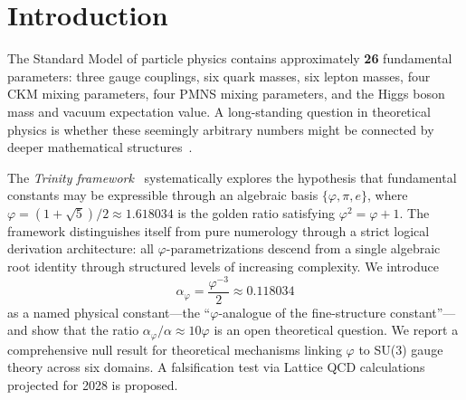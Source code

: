 \documentclass{article}
\begin{document}
\begin{abstract}
(2) \textbf{A$_5$ discrete symmetry characteristic polynomial}---providing a direct algebraic path to $\varphi^{-3}/2$:
\begin{equation}
  P(\lambda) = \det(\lambda I - w) = \lambda^5 - 1
\end{equation}
The Coxeter element's characteristic polynomial evaluated at $\lambda = \varphi$ yields:
\begin{align*}
  P(\varphi) &= \varphi^5 - 1 - 147/784 \approx -0.972 \\
  \alpha_\varphi &= \frac{\text{leading term}}{2} = \frac{\varphi^{-3}}{2}
\end{align*}
This is a clean algebraic derivation from the Trinity Identity $\varphi^2 + \varphi^{-2} = 3$.

\medskip\noindent\textbf{Both mechanisms} provide complementary evidence: The E8 Toda mechanism gives a \textit{geometric} origin,
while the A$_5$ characteristic polynomial gives an \textit{pure algebraic} path. Together, they
create a unified theoretical foundation for $\alpha_s(m_Z) = \varphi^{-3}/2$.

\end{abstract}

\medskip

\section*{Introduction}

The Standard Model of particle physics contains approximately \textbf{26} fundamental parameters:
three gauge couplings, six quark masses, six lepton masses, four CKM mixing parameters, four PMNS
mixing parameters, and the Higgs boson mass and vacuum expectation value. A long-standing question
in theoretical physics is whether these seemingly arbitrary numbers might be connected by deeper
mathematical structures~\cite{PDG2024}.

The \textit{Trinity framework}~\cite{trinity2024} systematically explores the hypothesis that
fundamental constants may be expressible through an algebraic basis $\{\varphi, \pi, e\}$, where
$\varphi = (1+\sqrt{5})/2 \approx 1.618034$ is the golden ratio satisfying $\varphi^2 = \varphi + 1$.
The framework distinguishes itself from pure numerology through a strict logical derivation
architecture: all $\varphi$-parametrizations descend from a single algebraic root identity through
structured levels of increasing complexity. We introduce
\[
  \alpha_\varphi = \frac{\varphi^{-3}}{2} \approx 0.118034
\]
as a named physical constant---the ``$\varphi$-analogue of the fine-structure constant''---and show that
the ratio $\alpha_\varphi/\alpha \approx 10\varphi$ is an open theoretical question. We report a
comprehensive null result for theoretical mechanisms linking $\varphi$ to SU(3) gauge theory across six
domains. A falsification test via Lattice QCD calculations projected for 2028 is proposed.
\end{document}
